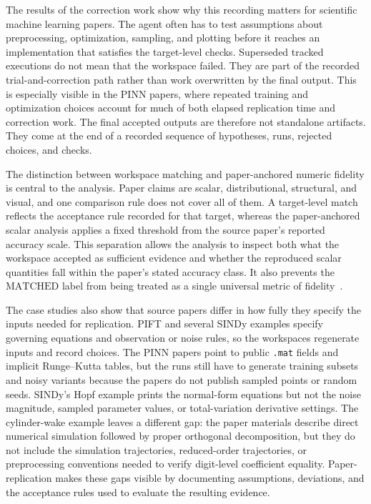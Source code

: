 \documentclass[authoryear,5p,times,nopreprintline]{elsarticle}
\begin{document}
The results of the correction work show why this recording matters for scientific machine learning papers.
The agent often has to test assumptions about preprocessing, optimization, sampling, and plotting before it reaches an implementation that satisfies the target-level checks.
Superseded tracked executions do not mean that the workspace failed.
They are part of the recorded trial-and-correction path rather than work overwritten by the final output.
This is especially visible in the PINN papers, where repeated training and optimization choices account for much of both elapsed replication time and correction work.
The final accepted outputs are therefore not standalone artifacts.
They come at the end of a recorded sequence of hypotheses, runs, rejected choices, and checks.

The distinction between workspace matching and paper-anchored numeric fidelity is central to the analysis.
Paper claims are scalar, distributional, structural, and visual, and one comparison rule does not cover all of them.
A target-level match reflects the acceptance rule recorded for that target, whereas the paper-anchored scalar analysis applies a fixed threshold from the source paper's reported accuracy scale.
This separation allows the analysis to inspect both what the workspace accepted as sufficient evidence and whether the reproduced scalar quantities fall within the paper's stated accuracy class.
It also prevents the \(\mathrm{MATCHED}\) label from being treated as a single universal metric of fidelity~\citep{manheim2018categorizing,weng2024rewardhacking}.

The case studies also show that source papers differ in how fully they specify the inputs needed for replication.
PIFT and several SINDy examples specify governing equations and observation or noise rules, so the workspaces regenerate inputs and record choices.
The PINN papers point to public \texttt{.mat} fields and implicit Runge--Kutta tables, but the runs still have to generate training subsets and noisy variants because the papers do not publish sampled points or random seeds.
SINDy's Hopf example prints the normal-form equations but not the noise magnitude, sampled parameter values, or total-variation derivative settings.
The cylinder-wake example leaves a different gap: the paper materials describe direct numerical simulation followed by proper orthogonal decomposition, but they do not include the simulation trajectories, reduced-order trajectories, or preprocessing conventions needed to verify digit-level coefficient equality.
Paper-replication makes these gaps visible by documenting assumptions, deviations, and the acceptance rules used to evaluate the resulting evidence.
\end{document}

